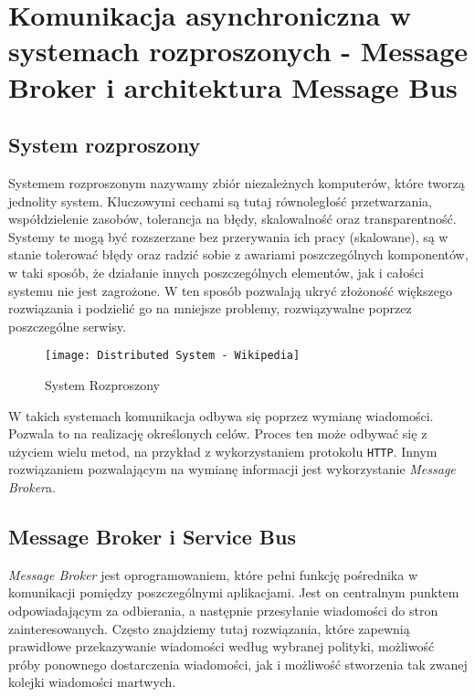 \section{Komunikacja asynchroniczna w systemach rozproszonych - Message Broker i architektura Message Bus}

\subsection{System rozproszony}

\par Systemem rozproszonym nazywamy zbiór niezależnych komputerów, które tworzą jednolity system. Kluczowymi cechami są tutaj równoległość przetwarzania, współdzielenie zasobów, tolerancja na błędy, skalowalność oraz transparentność. Systemy te mogą być rozszerzane bez przerywania ich pracy (skalowane), są w stanie tolerować błędy oraz radzić sobie z awariami poszczególnych komponentów, w taki sposób, że działanie innych poszczególnych elementów, jak i całości systemu nie jest zagrożone. W ten sposób pozwalają ukryć złożoność większego rozwiązania i podzielić go na mniejsze problemy, rozwiązywalne poprzez poszczególne serwisy.

\begin{figure}
    \centering
    \texttt{[image: Distributed System - Wikipedia]}
    \caption{System Rozproszony}
    \label{fig:distibutedSystemWikipedia}
\end{figure}

\par W takich systemach komunikacja odbywa się poprzez wymianę wiadomości. Pozwala to na realizację określonych celów. Proces ten może odbywać się z użyciem wielu metod, na przykład z wykorzystaniem protokołu \texttt{HTTP}. Innym rozwiązaniem pozwalającym na wymianę informacji jest wykorzystanie \emph{Message Broker}a.

\subsection{Message Broker i Service Bus}

\par \emph{Message Broker} jest oprogramowaniem, które pełni funkcję pośrednika w komunikacji pomiędzy poszczególnymi aplikacjami. Jest on centralnym punktem odpowiadającym za odbierania, a następnie przesyłanie wiadomości do stron zainteresowanych. Często znajdziemy tutaj rozwiązania, które zapewnią prawidłowe przekazywanie wiadomości według wybranej polityki, możliwość próby ponownego dostarczenia wiadomości, jak i możliwość stworzenia tak zwanej kolejki wiadomości martwych.

